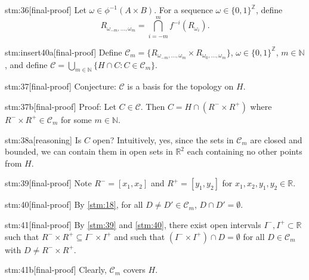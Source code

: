 \documentclass{article}
\begin{document}
\begin{stm}{stm:36}[final-proof]
Let $\omega \in \phi^{-1}(A \times B)$. For a sequence $\omega \in \{0,1\}^\mathbb{Z}$, define 
\[
R_{\omega_{-m}, \ldots, \omega_{m}} = \bigcap_{i = -m}^m f^{-i}(R_{\omega_i}).
\]
\end{stm}

\begin{stm}{stm:insert40a}[final-proof]
Define $\mathcal{C}_m = \{ R_{\omega_{-m},\ldots,\omega_m} \times R_{\omega_0,\ldots,\omega_m} \}$, $\omega \in \{0,1\}^\mathbb{Z}$, $m \in \mathbb{N}$, and define $\mathcal{C} = \bigcup_{m \in \mathbb{N}} \{ H \cap C : C \in \mathcal{C}_m \}$.
\end{stm}

\begin{stm}{stm:37}[final-proof]
Conjecture: $\mathcal{C}$ is a basis for the topology on $H$.
\end{stm}

\begin{stm}{stm:37b}[final-proof]
Proof: Let $C \in \mathcal{C}$. Then $C = H \cap (R^- \times R^+)$ where $R^- \times R^+ \in \mathcal{C}_m$ for some $m \in \mathbb{N}$.
\end{stm}

\begin{stm}{stm:38a}[reasoning]
Is $C$ open? Intuitively, yes, since the sets in $\mathcal{C}_m$ are closed and bounded, we can contain them in open sets in $\mathbb{R}^2$ each containing no other points from $H$.
\end{stm}

\begin{stm}{stm:39}[final-proof]
Note $R^- = [x_1, x_2]$ and $R^+ = [y_1, y_2]$ for $x_1,x_2,y_1,y_2 \in \mathbb{R}$.
\end{stm}

\begin{stm}{stm:40}[final-proof]
By \ref{stm:18}, for all $D \ne D' \in \mathcal{C}_m$, $D \cap D' = \emptyset$.
\end{stm}

\begin{stm}{stm:41}[final-proof]
By \ref{stm:39} and \ref{stm:40}, there exist open intervals $I^-, I^+ \subset \mathbb{R}$ such that $R^- \times R^+ \subseteq I^- \times I^+$ and such that $(I^- \times I^+) \cap D = \emptyset$ for all $D \in \mathcal{C}_m$ with $D \ne R^- \times R^+$. 
\end{stm}

\begin{stm}{stm:41b}[final-proof]
Clearly, $\mathcal{C}_m$ covers $H$.
\end{stm}
\end{document}
